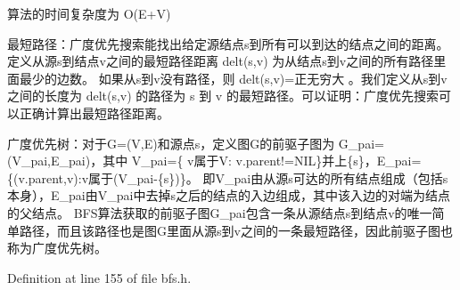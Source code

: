 算法的时间复杂度为 O(E+\+V)

最短路径：广度优先搜索能找出给定源结点s到所有可以到达的结点之间的距离。定义从源s到结点v之间的最短路径距离 delt(s,v) 为从结点s到v之间的所有路径里面最少的边数。 如果从s到v没有路径，则 delt(s,v)=正无穷大 。我们定义从s到v之间的长度为 delt(s,v) 的路径为 s 到 v 的最短路径。可以证明：广度优先搜索可以正确计算出最短路径距离。

广度优先树：对于\+G=(V,E)和源点s，定义图\+G的前驱子图为 G\+\_\+pai=(V\+\_\+pai,E\+\_\+pai)，其中 V\+\_\+pai=\{ v属于\+V\+: v.\+parent!=N\+I\+L\}并上\{s\}，\+E\+\_\+pai=\{(v.\+parent,v)\+:v属于(V\+\_\+pai-\/\{s\})\}。 即\+V\+\_\+pai由从源s可达的所有结点组成（包括s本身），\+E\+\_\+pai由\+V\+\_\+pai中去掉s之后的结点的入边组成，其中该入边的对端为结点的父结点。 B\+F\+S算法获取的前驱子图\+G\+\_\+pai包含一条从源结点s到结点v的唯一简单路径，而且该路径也是图\+G里面从源s到v之间的一条最短路径，因此前驱子图也称为广度优先树。 

Definition at line 155 of file bfs.\+h.

\hypertarget{namespace_introduction_to_algorithm_1_1_graph_algorithm_a5d500378f28e485a3b9a9b9cc74e4f97}{}
